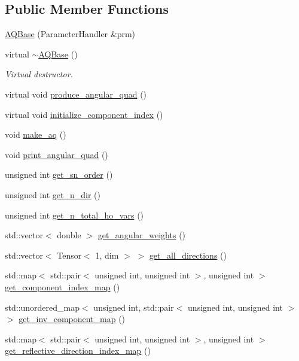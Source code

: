\subsection*{Public Member Functions}
\begin{DoxyCompactItemize}
\item 
\hyperlink{class_a_q_base_a3a05ceb6b201b4e6e605b260d766842d}{A\+Q\+Base} (Parameter\+Handler \&prm)
\item 
virtual \hyperlink{class_a_q_base_ab394068aae3c9b3f3932c3bfa3edceab}{$\sim$\+A\+Q\+Base} ()
\begin{DoxyCompactList}\small\item\em Virtual destructor. \end{DoxyCompactList}\item 
virtual void \hyperlink{class_a_q_base_a16c7871be0da6c112f547f39d50258fd}{produce\+\_\+angular\+\_\+quad} ()
\item 
virtual void \hyperlink{class_a_q_base_ab1cbcd2132328df15fb9651597e8ab48}{initialize\+\_\+component\+\_\+index} ()
\item 
void \hyperlink{class_a_q_base_ad8bf7c63bde67a2f514aea2c589983dd}{make\+\_\+aq} ()
\item 
void \hyperlink{class_a_q_base_adbe2961a0c0db888ca6a22ead08732eb}{print\+\_\+angular\+\_\+quad} ()
\item 
unsigned int \hyperlink{class_a_q_base_a9ce78884d13c584a8f415c16976ea6f0}{get\+\_\+sn\+\_\+order} ()
\item 
unsigned int \hyperlink{class_a_q_base_a803528777761efa898b046e374008744}{get\+\_\+n\+\_\+dir} ()
\item 
unsigned int \hyperlink{class_a_q_base_af367f668495d928c27a985b081868c6c}{get\+\_\+n\+\_\+total\+\_\+ho\+\_\+vars} ()
\item 
std\+::vector$<$ double $>$ \hyperlink{class_a_q_base_ac3db7e901486ff088e4eac2f1401f3b6}{get\+\_\+angular\+\_\+weights} ()
\item 
std\+::vector$<$ Tensor$<$ 1, dim $>$ $>$ \hyperlink{class_a_q_base_ac2e0120510426f0b1dded2d5b546038b}{get\+\_\+all\+\_\+directions} ()
\item 
std\+::map$<$ std\+::pair$<$ unsigned int, unsigned int $>$, unsigned int $>$ \hyperlink{class_a_q_base_a016f7ac88052a26c82c8aa3bfba80f73}{get\+\_\+component\+\_\+index\+\_\+map} ()
\item 
std\+::unordered\+\_\+map$<$ unsigned int, std\+::pair$<$ unsigned int, unsigned int $>$ $>$ \hyperlink{class_a_q_base_a6c6f10b941afa4019a5d919eee33ebee}{get\+\_\+inv\+\_\+component\+\_\+map} ()
\item 
std\+::map$<$ std\+::pair$<$ unsigned int, unsigned int $>$, unsigned int $>$ \hyperlink{class_a_q_base_a1cb901657861f7fc580fc29e10c0b691}{get\+\_\+reflective\+\_\+direction\+\_\+index\+\_\+map} ()
\end{DoxyCompactItemize}
